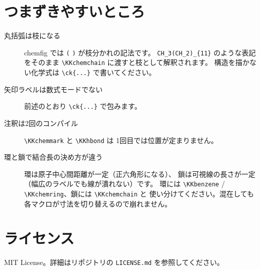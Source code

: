 \documentclass[paper=a4paper,fontsize=10pt]{jlreq}
\begin{document}
\begin{center}
\KKmaleicacid\qquad\KKfumaricacid
\end{center}

\section{つまずきやすいところ}

\begin{description}
\item[丸括弧は枝になる] \textsf{chemfig} では \verb|(| \verb|)| が枝分かれの記法です。
      \verb|CH_3(CH_2)_{11}| のような表記をそのまま
      \verb|\KKchemchain| に渡すと枝として解釈されます。
      構造を描かない化学式は \verb|\ck{...}| で書いてください。
\item[矢印ラベルは数式モードでない] 前述のとおり \verb|\ck{...}| で包みます。
\item[注釈は2回のコンパイル] \verb|\KKchemmark| と \verb|\KKhbond| は
      1回目では位置が定まりません。
\item[環と鎖で結合長の決め方が違う] 環は原子中心間距離が一定（正六角形になる）、
      鎖は可視線の長さが一定（幅広のラベルでも線が潰れない）です。
      環には \verb|\KKbenzene| / \verb|\KKchemring|、鎖には \verb|\KKchemchain| と
      使い分けてください。混在しても各マクロが寸法を切り替えるので崩れません。
\end{description}

\section{ライセンス}

MIT License。詳細はリポジトリの \verb|LICENSE.md| を参照してください。
\end{document}
